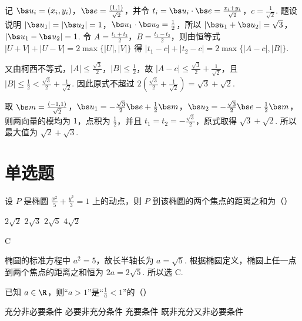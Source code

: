 \begin{solution}
记 \(\bs u_i=(x_i,y_i)\)，\(\bs e=\frac{(1,1)}{\sqrt2}\)，并令 \(t_i=\bs u_i\cdot\bs e=\frac{x_i+y_i}{\sqrt2}\)，\(c=\frac1{\sqrt2}\). 题设说明 \(\lvert\bs u_1\rvert=\lvert\bs u_2\rvert=1\)，\(\bs u_1\cdot\bs u_2=\frac12\)，所以
\(\lvert\bs u_1+\bs u_2\rvert=\sqrt3\)，\(\lvert\bs u_1-\bs u_2\rvert=1\). 令 \(A=\frac{t_1+t_2}{2}\)，\(B=\frac{t_1-t_2}{2}\)，则由恒等式 \(\lvert U+V\rvert+\lvert U-V\rvert=2\max\{\lvert U\rvert,\lvert V\rvert\}\) 得
\(\lvert t_1-c\rvert+\lvert t_2-c\rvert=2\max\{\lvert A-c\rvert,\lvert B\rvert\}\).

又由柯西不等式，\(\lvert A\rvert\le\frac{\sqrt3}{2}\)，\(\lvert B\rvert\le\frac12\)，故 \(\lvert A-c\rvert\le\frac{\sqrt3}{2}+\frac1{\sqrt2}\)，且 \(\lvert B\rvert\le\frac12<\frac{\sqrt3}{2}+\frac1{\sqrt2}\). 因此原式不超过 \(2\left(\frac{\sqrt3}{2}+\frac1{\sqrt2}\right)=\sqrt3+\sqrt2\).

取 \(\bs m=\frac{(-1,1)}{\sqrt2}\)，\(\bs u_1=-\frac{\sqrt3}{2}\bs e+\frac12\bs m\)，\(\bs u_2=-\frac{\sqrt3}{2}\bs e-\frac12\bs m\)，则两向量的模均为 \(1\)，点积为 \(\frac12\)，并且 \(t_1=t_2=-\frac{\sqrt3}{2}\)，原式取得 \(\sqrt3+\sqrt2\). 所以最大值为 \(\sqrt2+\sqrt3\).
\end{solution}

\section{单选题}

\begin{problem}
设 \(P\) 是椭圆 \(\frac{x^2}{5}+\frac{y^2}{3}=1\) 上的动点，则 \(P\) 到该椭圆的两个焦点的距离之和为（\quad）

\choices
    {\(2\sqrt2\)}
    {\(2\sqrt3\)}
    {\(2\sqrt5\)}
    {\(4\sqrt2\)}
\end{problem}

\begin{answer}
C
\end{answer}

\begin{solution}
椭圆的标准方程中 \(a^2=5\)，故长半轴长为 \(a=\sqrt5\). 根据椭圆定义，椭圆上任一点到两个焦点的距离之和恒为 \(2a=2\sqrt5\). 所以选 C.
\end{solution}

\begin{problem}
已知 \(a\in\R\)，则“\(a>1\)”是“\(\frac1a<1\)”的（\quad）

\choices
    {充分非必要条件}
    {必要非充分条件}
    {充要条件}
    {既非充分又非必要条件}
\end{problem}


